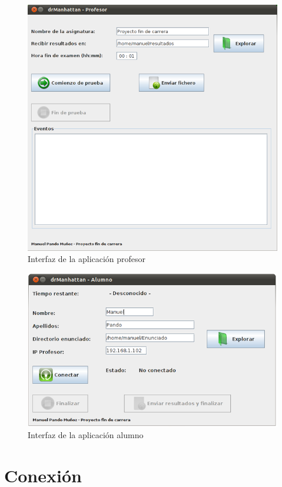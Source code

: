 \begin{figure}
    \centering
    \includegraphics[width=.90\linewidth]{iteracion1/GUIProfesor}
    \caption{Interfaz de la aplicación profesor}
    \label{fig:iteracion1:GUIProf}
\end{figure}


\begin{figure}
    \centering
    \includegraphics[width=.90\linewidth]{iteracion1/GUIAlumno}
    \caption{Interfaz de la aplicación alumno}
    \label{fig:iteracion1:GUIAlu}
\end{figure}



\section{Conexión}
\label{sec:iteracion1:conexion}

